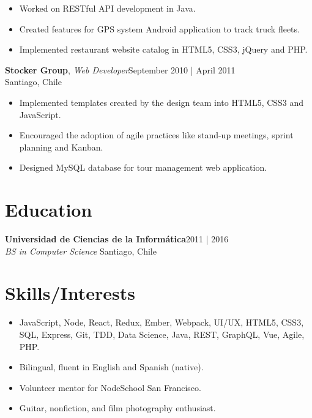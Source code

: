 \documentclass[line,letterpaper, 10pt]{res}
\begin{document}
\begin{resume}
	\begin{itemize} \itemsep 3pt
	\item Worked on RESTful API development in Java.
	\item Created features for GPS system Android application to track truck fleets.
	\item Implemented restaurant website catalog in HTML5, CSS3, jQuery and PHP.
	
	\end{itemize}

	\textbf{Stocker Group}, {\sl Web Developer}\hfill September 2010 | April 2011
	\\Santiago, Chile
	\\

	\begin{itemize} \itemsep 3pt
	\item Implemented templates created by the design team into HTML5, CSS3 and JavaScript.
	\item Encouraged the adoption of agile practices like stand-up meetings, sprint planning and Kanban.
	\item Designed MySQL database for tour management web application.
	
	\end{itemize}

	\section{Education}
	\textbf{Universidad de Ciencias de la Informática}\hfill 2011 | 2016
	\\{\sl BS in Computer Science} \hfill Santiago, Chile

	\section{Skills/Interests}
	\begin{itemize}
	\item JavaScript, Node, React, Redux, Ember, Webpack, UI/UX, HTML5, CSS3, SQL, Express, Git, TDD, Data Science, Java, REST, GraphQL, Vue, Agile, PHP.
	\item Bilingual, fluent in English and Spanish (native).
	\item Volunteer mentor for NodeSchool San Francisco.
	\item Guitar, nonfiction, and film photography enthusiast.
	\end{itemize}

\end{resume}
\end{document}
